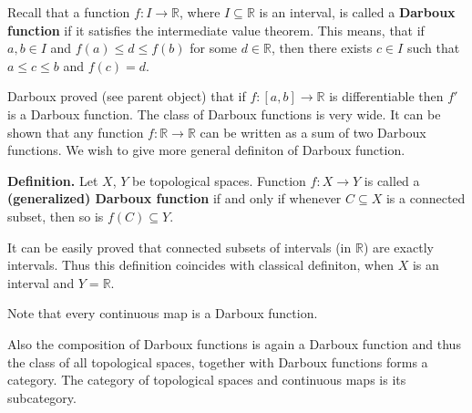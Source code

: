 \documentclass[12pt]{article}
\begin{document}
Recall that a function $f:I\to\mathbb{R}$, where $I\subseteq\mathbb{R}$ is an interval, is called a \textbf{Darboux function} if it satisfies the intermediate value theorem. This means, that if $a,b\in I$ and $f(a)\leqslant d\leqslant f(b)$ for some $d\in\mathbb{R}$, then there exists $c\in I$ such that $a\leqslant c\leqslant b$ and $f(c)=d$.

Darboux proved (see parent object) that if $f:[a,b]\to\mathbb{R}$ is differentiable then $f'$ is a Darboux function. The class of Darboux functions is very wide. It can be shown that any function $f:\mathbb{R}\to\mathbb{R}$ can be written as a sum of two Darboux functions. We wish to give more general definiton of Darboux function.

\textbf{Definition.} Let $X$, $Y$ be topological spaces. Function $f:X\to Y$ is called a \textbf{(generalized) Darboux function} if and only if whenever $C\subseteq X$ is a connected subset, then so is $f(C)\subseteq Y$.

It can be easily proved that connected subsets of intervals (in $\mathbb{R}$) are exactly intervals. Thus this definition coincides with classical definiton, when $X$ is an interval and $Y=\mathbb{R}$.

Note that every continuous map is a Darboux function.

Also the composition of Darboux functions is again a Darboux function and thus the class of all topological spaces, together with Darboux functions forms a category. The category of topological spaces and continuous maps is its subcategory.
\end{document}
